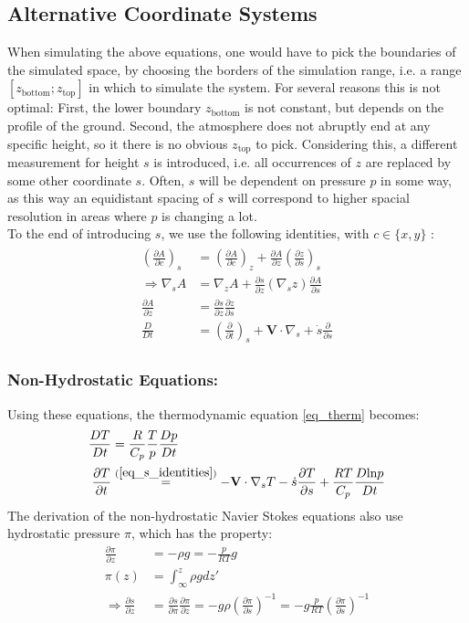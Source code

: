 \subsection{Alternative Coordinate Systems}
When simulating the above equations, one would have to pick the boundaries of the simulated space, by choosing the borders of the simulation range, i.e. a range $[z_{\text{bottom}};z_{\text{top}}]$ in which to simulate the system.
For several reasons this is not optimal:
First, the lower boundary $z_{\text{bottom}}$ is not constant, but depends on the profile of the ground.
Second, the atmosphere does not abruptly end at any specific height, so it there is no obvious $z_{\text{top}}$ to pick.
Considering this, a different measurement for height $s$ is introduced, i.e. all occurrences of $z$ are replaced by some other coordinate $s$.
Often, $s$ will be dependent on pressure $p$ in some way, as this way an equidistant spacing of $s$ will correspond to higher spacial resolution in areas where $p$ is changing a lot.\\
To the end of introducing $s$, we use the following identities, with $c\in\{x,y\}$ \cite{kasahara1974various}:
\begin{align}
\begin{split}
(\frac{\partial A}{\partial c})_s &= (\frac{\partial A}{\partial c})_z + \frac{\partial A}{\partial z}(\frac{\partial z}{\partial s})_s\\
\Rightarrow \nabla _s A &= \nabla _z A+\frac{\partial s}{\partial z}(\nabla _sz)\frac{\partial A}{\partial s}\\
\frac{\partial A}{\partial z} &= \frac{\partial s}{\partial z} \frac{\partial z}{\partial s}\\
\frac{D}{Dt} &= (\frac{\partial}{\partial t})_s + \textbf{V} \cdot \nabla _s + \dot{s}\frac{\partial }{\partial s}
\end{split}\label{eq_s_identities}
\end{align}


\subsubsection{Non-Hydrostatic Equations:}
Using these equations, the thermodynamic equation \ref{eq_therm} becomes:
\begin{align*}
\frac{DT}{Dt} &= \frac{R}{C_p}\frac{T}{p}\frac{Dp}{Dt}\\
\frac{\partial T}{\partial t} &\stackrel{(\ref{eq_s_identities})}{=} -\textbf{V} \cdot \nabla _s T - \dot{s} \frac{\partial T}{\partial s}+\frac{RT}{C_p}\frac{D\text{ln}p}{Dt}
\end{align*}
The derivation of the non-hydrostatic Navier Stokes equations also use hydrostatic pressure $\pi$, which has the property:
\begin{align}
\frac{\partial \pi}{\partial z} &= -\rho g = - \frac{p}{RT}g \nonumber \\
\pi(z) &= \int_\infty ^z \rho g dz' \nonumber \\
\Rightarrow \frac{\partial s}{\partial z} &= \frac{\partial s}{\partial \pi}\frac{\partial \pi}{\partial z} = - g\rho(\frac{\partial \pi}{\partial s})^{-1} = - g\frac{p}{RT}(\frac{\partial \pi}{\partial s})^{-1} \label{eq_ds_dz}
\end{align}

